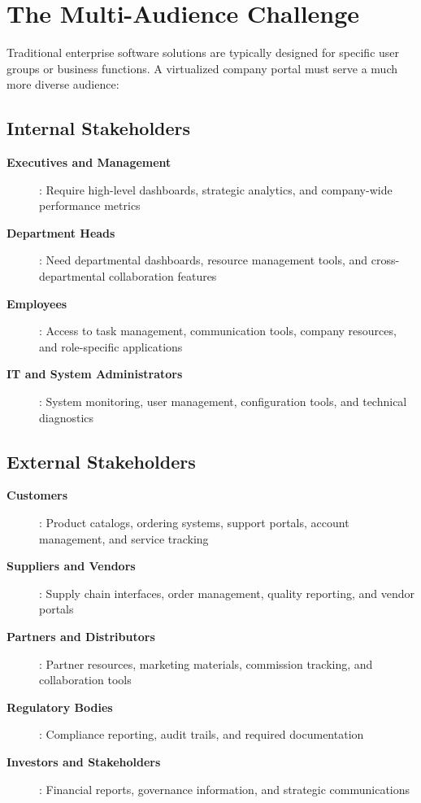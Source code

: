 \section{The Multi-Audience Challenge}
\label{sec:multi-audience}

Traditional enterprise software solutions are typically designed for specific user groups or business functions. A virtualized company portal must serve a much more diverse audience:

\subsection{Internal Stakeholders}

\begin{description}
\item[\textbf{Executives and Management}]: Require high-level dashboards, strategic analytics, and company-wide performance metrics
\item[\textbf{Department Heads}]: Need departmental dashboards, resource management tools, and cross-departmental collaboration features
\item[\textbf{Employees}]: Access to task management, communication tools, company resources, and role-specific applications
\item[\textbf{IT and System Administrators}]: System monitoring, user management, configuration tools, and technical diagnostics
\end{description}

\subsection{External Stakeholders}

\begin{description}
\item[\textbf{Customers}]: Product catalogs, ordering systems, support portals, account management, and service tracking
\item[\textbf{Suppliers and Vendors}]: Supply chain interfaces, order management, quality reporting, and vendor portals
\item[\textbf{Partners and Distributors}]: Partner resources, marketing materials, commission tracking, and collaboration tools
\item[\textbf{Regulatory Bodies}]: Compliance reporting, audit trails, and required documentation
\item[\textbf{Investors and Stakeholders}]: Financial reports, governance information, and strategic communications
\end{description}

